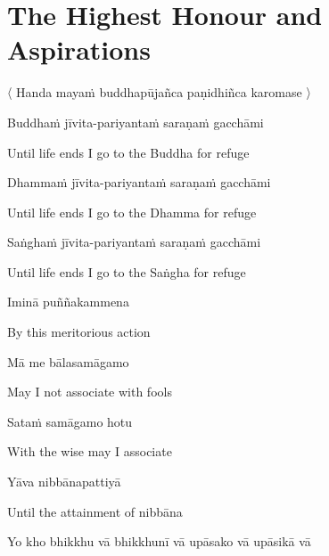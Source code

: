 

\section{The Highest Honour and Aspirations}
\label{highest-honour-aspirations}

\begin{leader}
  〈 Handa mayaṁ buddhapūjañca paṇidhiñca karomase 〉

\end{leader}

Buddhaṁ jīvita-pariyantaṁ saraṇaṁ gacchāmi

\begin{english}
  Until life ends I go to the Buddha for refuge
\end{english}

Dhammaṁ jīvita-pariyantaṁ saraṇaṁ gacchāmi

\begin{english}
  Until life ends I go to the Dhamma for refuge
\end{english}

Saṅghaṁ jīvita-pariyantaṁ saraṇaṁ gacchāmi

\begin{english}
  Until life ends I go to the Saṅgha for refuge
\end{english}

Iminā puññakammena

\begin{english}
  By this meritorious action
\end{english}

Mā me bālasamāgamo

\begin{english}
  May I not associate with fools
\end{english}

Sataṁ samāgamo hotu

\begin{english}
  With the wise may I associate
\end{english}

Yāva nibbānapattiyā

\begin{english}
  Until the attainment of nibbāna
\end{english}


Yo kho bhikkhu vā bhikkhunī vā upāsako vā upāsikā vā


